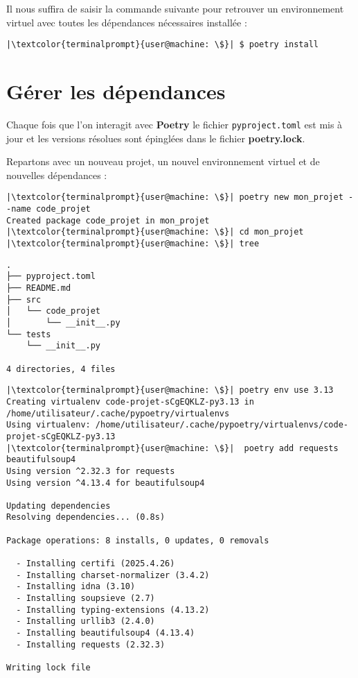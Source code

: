Il nous suffira de saisir la commande suivante pour retrouver un environnement virtuel avec toutes les dépendances nécessaires installée :
\begin{lstlisting}[style=terminal]
|\textcolor{terminalprompt}{user@machine: \$}| $ poetry install
\end{lstlisting}

\section{Gérer les dépendances}
Chaque fois que l'on interagit avec \textbf{Poetry} le fichier \texttt{pyproject.toml} est mis à jour et les versions résolues sont épinglées dans le fichier \textbf{poetry.lock}.

Repartons avec un nouveau projet, un nouvel environnement virtuel et de nouvelles dépendances :
\begin{lstlisting}[style=terminal]
|\textcolor{terminalprompt}{user@machine: \$}| poetry new mon_projet --name code_projet
Created package code_projet in mon_projet
|\textcolor{terminalprompt}{user@machine: \$}| cd mon_projet
|\textcolor{terminalprompt}{user@machine: \$}| tree
\end{lstlisting}
\begin{verbatim}
.
├── pyproject.toml
├── README.md
├── src
│   └── code_projet
│       └── __init__.py
└── tests
    └── __init__.py

4 directories, 4 files
\end{verbatim}
\begin{lstlisting}[style=terminal]
|\textcolor{terminalprompt}{user@machine: \$}| poetry env use 3.13
Creating virtualenv code-projet-sCgEQKLZ-py3.13 in /home/utilisateur/.cache/pypoetry/virtualenvs
Using virtualenv: /home/utilisateur/.cache/pypoetry/virtualenvs/code-projet-sCgEQKLZ-py3.13
|\textcolor{terminalprompt}{user@machine: \$}|  poetry add requests beautifulsoup4
Using version ^2.32.3 for requests
Using version ^4.13.4 for beautifulsoup4

Updating dependencies
Resolving dependencies... (0.8s)

Package operations: 8 installs, 0 updates, 0 removals

  - Installing certifi (2025.4.26)
  - Installing charset-normalizer (3.4.2)
  - Installing idna (3.10)
  - Installing soupsieve (2.7)
  - Installing typing-extensions (4.13.2)
  - Installing urllib3 (2.4.0)
  - Installing beautifulsoup4 (4.13.4)
  - Installing requests (2.32.3)

Writing lock file
\end{lstlisting}

